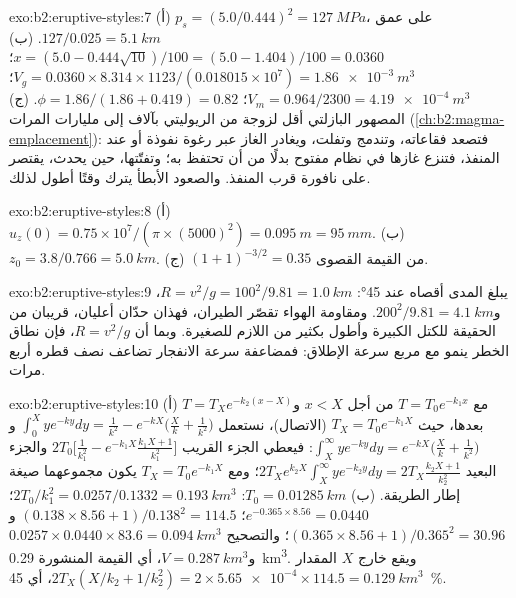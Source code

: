 \begin{solution}{exo:b2:eruptive-styles:7}
(أ) $p_s = (5.0/0.444)^2 = \qty{127}{MPa}$، على عمق $127/0.025 = \qty{5.1}{km}$.
(ب) $x = (5.0 - 0.444\sqrt{10})/100 = (5.0 - 1.404)/100 = 0.0360$؛
$V_g = 0.0360\times8.314\times1123/(0.018015\times10^7) = \qty{1.86e-3}{m^3}$؛
$V_m = 0.964/2300 = \qty{4.19e-4}{m^3}$؛ $\phi = 1.86/(1.86 + 0.419) = 0.82$.
(ج) المصهور البازلتي أقل لزوجة من الريوليتي بآلاف إلى مليارات
المرات (\cref{ch:b2:magma-emplacement}): فتصعد فقاعاته،
وتندمج وتفلت، ويغادر الغاز عبر رغوة نفوذة أو عند
المنفذ، فتنزع  غازها في نظام مفتوح بدلًا من أن تحتفظ به؛
وتفتّتها، حين يحدث، يقتصر على نافورة قرب المنفذ. والصعود الأبطأ
يترك وقتًا أطول لذلك.
\end{solution}

\begin{solution}{exo:b2:eruptive-styles:8}
(أ) $u_z(0) = 0.75\times10^7/(\pi\times(5000)^2) = \qty{0.095}{m} = \qty{95}{mm}$.
(ب) $z_0 = 3.8/0.766 = \qty{5.0}{km}$. (ج) $(1 + 1)^{-3/2} = 0.35$ من
القيمة القصوى.
\end{solution}

\begin{solution}{exo:b2:eruptive-styles:9}
يبلغ المدى أقصاه عند \ang{45}: $R = v^2/g = 100^2/9.81 = \qty{1.0}{km}$،
و$200^2/9.81 = \qty{4.1}{km}$. ومقاومة الهواء تقصّر الطيران، فهذان
حدّان أعليان، قريبان من الحقيقة للكتل الكبيرة وأطول بكثير من اللازم للصغيرة.
وبما أن $R = v^2/g$، فإن نطاق الخطر ينمو مع مربع سرعة الإطلاق:
فمضاعفة سرعة الانفجار تضاعف نصف قطره أربع مرات.
\end{solution}

\begin{solution}{exo:b2:eruptive-styles:10}
(أ) مع $T = T_0e^{-k_1x}$ من أجل $x < X$ و$T = T_Xe^{-k_2(x - X)}$ بعدها، حيث $T_X =
T_0e^{-k_1X}$ (الاتصال)، نستعمل $\int_0^X ye^{-ky}dy = \frac{1}{k^2} - e^{-kX}\big(\frac{X}{k} +
\frac{1}{k^2}\big)$ و$\int_X^\infty ye^{-ky}dy = e^{-kX}\big(\frac{X}{k} +
\frac{1}{k^2}\big)$:
فيعطي الجزء القريب $2T_0\big[\frac{1}{k_1^2} - e^{-k_1X}\frac{k_1X + 1}{k_1^2}\big]$
والجزء البعيد $2T_Xe^{k_2X}\int_X^\infty ye^{-k_2y}dy = 2T_X\frac{k_2X + 1}{k_2^2}$؛ ومع $T_X =
T_0e^{-k_1X}$ يكون مجموعهما صيغة إطار الطريقة.
(ب) $T_0 = \qty{0.01285}{km}$: $2T_0/k_1^2 = 0.0257/0.1332 = \qty{0.193}{km^3}$؛
$e^{-0.365\times8.56} = 0.0440$؛ $(0.138\times8.56 + 1)/0.138^2 = 114.5$
و$(0.365\times8.56 + 1)/0.365^2 = 30.96$؛ والتصحيح $0.0257\times0.0440\times83.6
= \qty{0.094}{km^3}$ و$V = \qty{0.287}{km^3}$، أي القيمة المنشورة \qty{0.29}{km^3}.
ويقع خارج $X$ المقدار $2T_X(X/k_2 + 1/k_2^2) = 2\times\num{5.65e-4}\times114.5 =
\qty{0.129}{km^3}$، أي \qty{45}{\percent}.
\end{solution}

